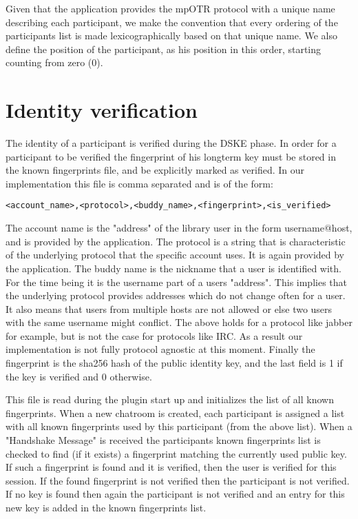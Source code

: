 Given that the application provides the mpOTR protocol with a unique name describing each participant, we make the convention that every ordering of the participants list is made lexicographically based on that unique name. We also define the position of the participant, as his position in this order, starting counting from zero (0).

\section{Identity verification}
The identity of a participant is verified during the DSKE phase.
In order for a participant to be verified the fingerprint of his longterm key must be stored in the known fingerprints file, and be explicitly marked as verified.
In our implementation this file is comma separated and is of the form:

\begin{verbatim}
<account_name>,<protocol>,<buddy_name>,<fingerprint>,<is_verified>
\end{verbatim}

The account name is the "address" of the library user in the form username@host, and is provided by the application.
The protocol is a string that is characteristic of the underlying protocol that the specific account uses.
It is again provided by the application.
The buddy name is the nickname that a user is identified with.
For the time being it is the username part of a users "address".
This implies that the underlying protocol provides addresses which do not change often for a user.
It also means that users from multiple hosts are not allowed or else two users with the same username might conflict.
The above holds for a protocol like jabber for example, but is not the case for protocols like IRC.
As a result our implementation is not fully protocol agnostic at this moment.
Finally the fingerprint is the sha256 hash of the public identity key, and the last field is 1 if the key is verified and 0 otherwise.

This file is read during the plugin start up and initializes the list of all known fingerprints.
When a new chatroom is created, each participant is assigned a list with all known fingerprints used by this participant (from the above list).
When a "Handshake Message" is received the participants known fingerprints list is checked to find (if it exists) a fingerprint matching the currently used public key.
If such a fingerprint is found and it is verified, then the user is verified for this session.
If the found fingerprint is not verified then the participant is not verified.
If no key is found then again the participant is not verified and an entry for this new key is added in the known fingerprints list. 

